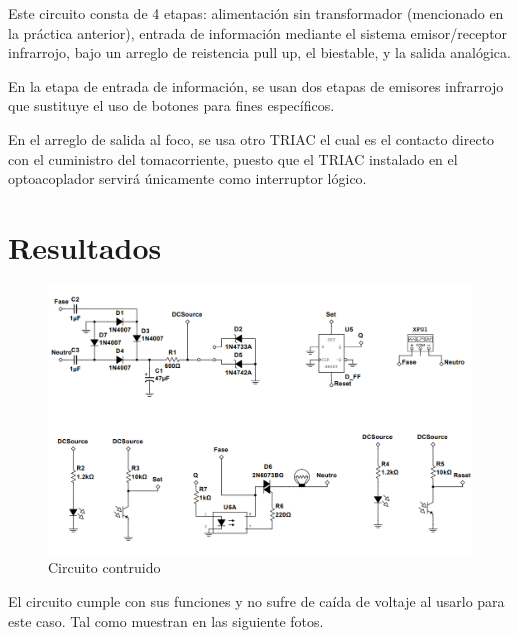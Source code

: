 \documentclass{article}
\begin{document}
Este circuito consta de 4 etapas: alimentación sin transformador (mencionado en la práctica anterior), entrada de información
mediante el sistema emisor/receptor infrarrojo, bajo un arreglo de reistencia pull up, el biestable, y la salida analógica.

En la etapa de entrada de información, se usan dos etapas de emisores infrarrojo que sustituye el uso de botones para 
fines específicos.

En el arreglo de salida al foco, se usa otro TRIAC el cual es el contacto directo con el cuministro del tomacorriente, puesto
que el TRIAC instalado en el optoacoplador servirá únicamente como interruptor lógico.

\section{Resultados}

\begin{figure}[h]
    \centering
    \includegraphics[scale=0.4]{Circuito.png}
    \caption{Circuito contruido}
    \label{Fig: Circuito contruido}
\end{figure}

El circuito cumple con sus funciones y no sufre de caída de voltaje al usarlo para este caso. Tal como muestran en las 
siguiente fotos.
\end{document}
